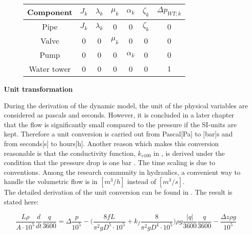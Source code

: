 \begin{figure}[H]
	\centering
\begin{tabular}{c|cccccc} 
		\bfseries Component    &     $J_k$  &$\lambda_k$    &    $\mu_k$    &   $\alpha_k$   &  $\zeta_k$   &  $\Delta p_{WT;k}$ \\\hline
		Pipe			  	   &     $J_k$  &$\lambda_k$    &    0          &   0            &  $\zeta_k$   &  0	    			\\ 
		Valve       	       &     0      &0              &    $\mu_k$    &   0 		     &  0    		&  0					\\ 
		Pump 		    	   &     0      &0              &    0          &   $\alpha_k$   &  0    		&  0	    			\\
		Water tower 	   	   &     0      &0              &    0          &   0            &  0    		&  $1$	
\end{tabular}
		\label{tab:parametrization_model}

\end{figure}	

\textbf{Unit transformation}
\label{unittransform}

During the derivation of the dynamic model, the unit of the physical variables are considered as pascals and seconds. However, it is concluded in a later chapter that the flow is significantly small compared to the pressure if the SI-units are kept. Therefore a unit conversion is carried out from Pascal[Pa] to [bar]s and from seconds[s] to hours[h].  Another reason which makes this conversion reasonable is that the conductivity function, $k_{v100}$ in , is derived under the condition that the pressure drop is one bar \cite{keller}. The time scaling is due to conventions. Among the research community in hydraulics, a convenient way to handle the volumetric flow is in $[m^3/h]$ instead of $[m^3/s]$. 
\\
The detailed derivation of the unit conversion can be found in . The result is stated here: 

\begin{equation}
   \frac{L \rho}{A\cdot10^5} \frac{d}{dt}\frac{q}{3600} = \Delta \frac{p}{10^5} - \Big(\frac{8fL}{\pi^{2}gD^5\cdot10^5} + k_f \frac{8}{\pi^2gD^4\cdot10^5}\Big) \rho g \frac{|q|}{3600} \frac{q}{3600} - \frac{\Delta z \rho g}{10^5}
\end{equation}
